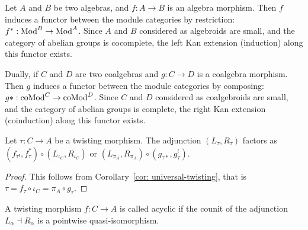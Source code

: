 \documentclass[../thesis.tex]{subfiles}
\begin{document}
            Let $A$ and $B$ be two algebras, and $f: A \rightarrow B$ is an algebra morphism. Then $f$ induces a functor between the module categories by restriction: $f^*: \tt{Mod}^B \rightarrow \tt{Mod}^A$. Since $A$ and $B$ considered as algebroids are small, and the category of abelian groups is cocomplete, the left Kan extension (induction) along this functor exists.
            \begin{center}
            \end{center}

            Dually, if $C$ and $D$ are two coalgebras and $g: C \rightarrow D$ is a coalgebra morphism. Then $g$ induces a functor between the module categories by composing: $g*: \tt{coMod}^C \rightarrow \tt{coMod}^D$. Since $C$ and $D$ considered as coalgebroids are small, and the category of abelian groups is complete, the right Kan extension (coinduction) along this functor exists.
            \begin{center}
            \end{center}

            \begin{lemma}\label{lem: twist-fac}
                Let $\tau: C \rightarrow A$ be a twisting morphism. The adjunction $(L_\tau, R_\tau)$ factors as $(f_{\tau !}, f_\tau^*)\circ (L_{\iota_C},R_{\iota_C})$ or $(L_{\pi_A},R_{\pi_A})\circ (g_{\tau *}, g_\tau^!)$.
            \end{lemma}

            \begin{proof}
                This follows from Corollary~\ref{cor: universal-twisting}, that is $\tau = f_\tau \circ \iota_C = \pi_A\circ g_\tau$.
            \end{proof}

            \begin{definition}
                A twisting morphism $f: C \rightarrow A$ is called acyclic if the counit of the adjunction $L_\alpha \dashv R_\alpha$ is a pointwise quasi-isomorphism.
            \end{definition}
\end{document}
